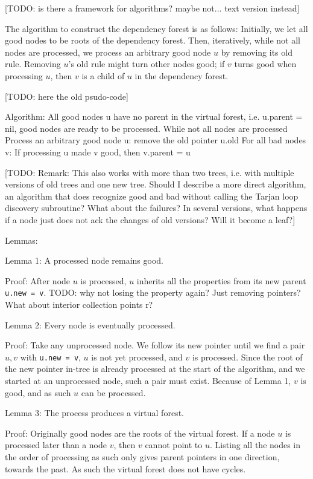 [TODO: is there a framework for algorithms? maybe not... text version instead]

The algorithm to construct the dependency forest is as follows: Initially, we let all good nodes to be roots of the dependency forest. Then, iteratively, while not all nodes are processed, we process an arbitrary good node $u$ by removing its old rule. Removing $u$'s old rule might turn other nodes good; if $v$ turns good when processing $u$, then $v$ is a child of $u$ in the dependency forest.

[TODO: here the old psudo-code]

Algorithm:
All good nodes u have no parent in the virtual forest, i.e. u.parent = nil, good nodes are ready to be processed.
While not all nodes are processed
	Process an arbitrary good node u: remove the old pointer u.old
	For all bad nodes v:
		If processing u made v good, then v.parent = u

[TODO: Remark: This also works with more than two trees, i.e. with multiple versions of old trees and one new tree. Should I describe a more direct algorithm, an algorithm that does recognize good and bad without calling the Tarjan loop discovery subroutine? What about the failures? In several versions, what happens if a node just does not ack the changes of old versions? Will it become a leaf?]

Lemmas:

Lemma 1: A processed node remains good.

Proof: After node $u$ is processed, $u$ inherits all the properties from its new parent \texttt{u.new = v}. TODO: why not losing the property again? Just removing pointers? What about interior collection points r?

Lemma 2: Every node is eventually processed.

Proof: Take any unprocessed node. We follow its new pointer until we find a pair $u,v$ with \texttt{u.new = v}, $u$ is not yet processed, and $v$ is processed. Since the root of the new pointer in-tree is already processed at the start of the algorithm, and we started at an unprocessed node, such a pair must exist. Because of Lemma 1, $v$ is good, and as such $u$ can be processed.

Lemma 3: The process produces a virtual forest.

Proof: Originally good nodes are the roots of the virtual forest. If a node $u$ is processed later than a node $v$, then $v$ cannot point to $u$. Listing all the nodes in the order of processing as such only gives parent pointers in one direction, towards the past. As such the virtual forest does not have cycles.

